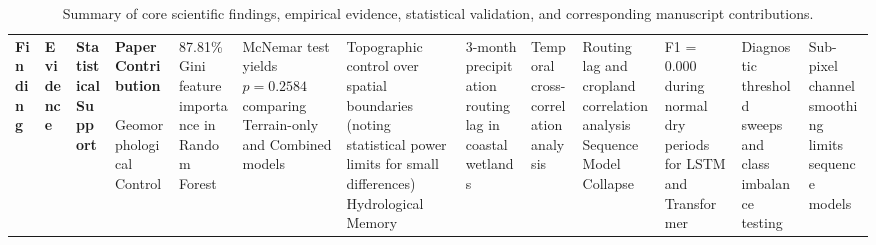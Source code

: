 \begin{table}[t]
\caption{Summary of core scientific findings, empirical evidence, statistical validation, and corresponding manuscript contributions.}
\label{tab:contribution_summary}
\centering
\small
\begin{tabular}{p{2.8cm} p{2.8cm} p{4.0cm} p{2.8cm}}
\hline
\textbf{Finding} & \textbf{Evidence} & \textbf{Statistical Support} & \textbf{Paper Contribution} \
\hline
Geomorphological Control & 87.81\% Gini feature importance in Random Forest & McNemar test yields $p = 0.2584$ comparing Terrain-only and Combined models & Topographic control over spatial boundaries (noting statistical power limits for small differences) \
\hline
Hydrological Memory & 3-month precipitation routing lag in coastal wetlands & Temporal cross-correlation analysis & Routing lag and cropland correlation analysis \
\hline
Sequence Model Collapse & F1 = 0.000 during normal dry periods for LSTM and Transformer & Diagnostic threshold sweeps and class imbalance testing & Sub-pixel channel smoothing limits sequence models \
\hline
\end{tabular}
\end{table}